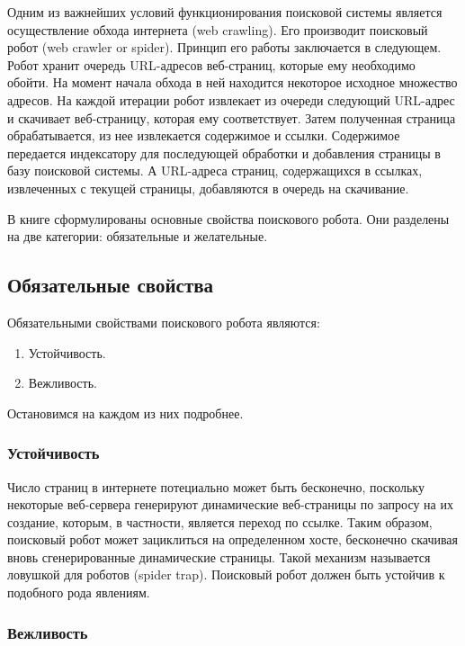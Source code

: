 Одним из важнейших условий функционирования поисковой системы является осуществление обхода интернета (web crawling). Его производит поисковый робот (web crawler or spider). Принцип его работы заключается в следующем. Робот хранит очередь URL-адресов веб-страниц, которые ему необходимо обойти. На момент начала обхода в ней находится некоторое исходное множество адресов. На каждой итерации робот извлекает из очереди следующий URL-адрес и скачивает веб-страницу, которая ему соответствует. Затем полученная страница обрабатывается, из нее извлекается содержимое и ссылки. Содержимое передается индексатору для последующей обработки и добавления страницы в базу поисковой системы. А URL-адреса страниц, содержащихся в ссылках, извлеченных с текущей страницы, добавляются в очередь на скачивание.

В книге \cite{Manning} сформулированы основные свойства поискового робота. Они разделены на две категории: обязательные и желательные.

\subsection{Обязательные свойства}

Обязательными свойствами поискового робота являются:
\begin{enumerate}
\item Устойчивость. 
\item Вежливость. 
\end{enumerate}

Остановимся на каждом из них подробнее.

\subsubsection*{Устойчивость}

Число страниц в интернете потециально может быть бесконечно, поскольку некоторые веб-сервера генерируют динамические веб-страницы по запросу на их создание, которым, в частности, является переход по ссылке. Таким образом, поисковый робот может зациклиться на определенном хосте, бесконечно скачивая вновь сгенерированные динамические страницы. Такой механизм называется ловушкой для роботов (spider trap). Поисковый робот должен быть устойчив к подобного рода явлениям.

\subsubsection*{Вежливость}

